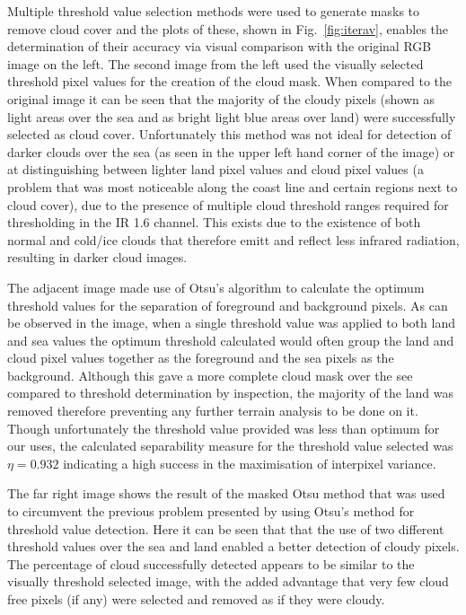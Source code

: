 Multiple threshold value selection methods were used to generate masks to remove cloud cover and the plots of these, shown in Fig.~\ref{fig:iterav}, enables the determination of their accuracy via visual comparison with the original RGB image on the left. The second image from the left used the visually selected threshold pixel values for the creation of the cloud mask. When compared to the original image it can be seen that the majority of the cloudy pixels (shown as light areas over the sea and as bright light blue areas over land) were successfully selected as cloud cover. Unfortunately this method was not ideal for detection of darker clouds over the sea (as seen in the upper left hand corner of the image) or at distinguishing between lighter land pixel values and cloud pixel values (a problem that was most noticeable along the coast line and certain regions next to cloud cover), due to the presence of multiple cloud threshold ranges required for thresholding in the IR 1.6 channel. This exists due to the existence of both normal and cold/ice clouds that therefore emitt and reflect less infrared radiation, resulting in darker cloud images.
\par
The adjacent image made use of Otsu's algorithm to calculate the optimum threshold values for the separation of foreground and background pixels. As can be observed in the image, when a single threshold value was applied to both land and sea values the optimum threshold calculated would often group the land and cloud pixel values together as the foreground and the sea pixels as the background. Although this gave a more complete cloud mask over the see compared to threshold determination by inspection, the majority of the land was removed therefore preventing any further terrain analysis to be done on it. Though unfortunately the threshold value provided was less than optimum for our uses, the calculated separability measure for the threshold value selected was $\eta=0.932$ indicating a high success in the maximisation of interpixel variance.
\par The far right image shows the result of the masked Otsu method that was used to circumvent the previous problem presented by using Otsu's method for threshold value detection. Here it can be seen that that the use of two different threshold values over the sea and land enabled a better detection of cloudy pixels. The percentage of cloud successfully detected appears to be similar to the visually threshold selected image, with the added advantage that very few cloud free pixels (if any) were selected and removed as if they were cloudy.\\

